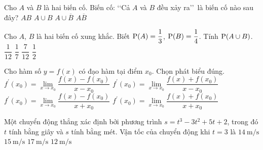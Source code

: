 \begin{ex}%
Cho $A$ và $B$ là hai biến cố. Biến cố: \lq\lq Cả $A$ và $B$ đều xảy ra\rq\rq  \ là biến cố nào sau đây?
\choice
{\True $AB$}
{$A \cup B$}
{$A\cup \overline{B}$}
{$A \overline{B}$}
\end{ex}
\begin{ex}%
	Cho $A$, $B$ là hai biến cố xung khắc. Biết ${\rm P}(A)=\dfrac{1}{3}$, ${\rm P}(B)=\dfrac{1}{4}$. Tính ${\rm P}(A \cup B)$.
	\choice
	{$\dfrac{1}{12}$}
	{$\dfrac{1}{7}$}
	{\True $\dfrac{7}{12}$}
	{$\dfrac{1}{2}$}
	\end{ex}

\begin{ex}%
Cho hàm số $y = f(x)$ có đạo hàm tại điểm $x_0$. Chọn phát biểu đúng.
\choice
{\True $f^\prime(x_0) = \lim\limits_{x \to x_0} \dfrac{f(x) - f(x_0)}{x - x_0}$}
{$f^\prime(x_0) = \lim\limits_{x \to x_0} \dfrac{f(x) + f(x_0)}{x - x_0}$}
{$f^\prime(x_0) = \lim\limits_{x \to x_0} \dfrac{f(x) - f(x_0)}{x + x_0}$}
{$f^\prime(x_0) = \lim\limits_{x \to x_0} \dfrac{f(x) + f(x_0)}{x + x_0}$}
\end{ex}

\begin{ex}%
	Một chuyển động thẳng xác định bởi phương trình $s=t^3 -3t^2 +5t+2$, trong đó $t$ tính bằng giây và $s$ tính bằng mét. Vận tốc của chuyển động khi $t=3$ là
	\choice
	{\True $14 ~\mathrm{m} / \mathrm{s}$}
	{$15 ~\mathrm{m} / \mathrm{s}$}
	{$17 ~\mathrm{m} / \mathrm{s}$}
	{$12 ~\mathrm{m} / \mathrm{s}$}
	\end{ex}

